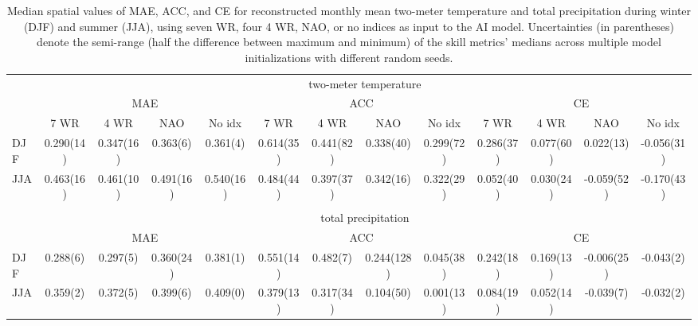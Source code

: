 \begin{table*}
    \centering
    \begin{tabular}{lcccccccccccc}
    \toprule
    &\multicolumn{12}{c}{two-meter temperature}\\
    &\multicolumn{4}{c}{MAE}    &\multicolumn{4}{c}{ACC}    &\multicolumn{4}{c}{CE}\\
    \cmidrule(lr){2-5} \cmidrule(lr){6-9} \cmidrule(lr){10-13}
              &7 WR  &4 WR  &NAO  &No idx  &7 WR  &4 WR  &NAO  &No idx  &7 WR  &4 WR  &NAO  &No idx\\
    DJF    &0.290(14)  &0.347(16)  &0.363(6)  &0.361(4)  &0.614(35)  &0.441(82)  &0.338(40)  &0.299(72)  &0.286(37)  &0.077(60)  &0.022(13)  &-0.056(31) \\
    JJA    &0.463(16)  &0.461(10)  &0.491(16)  &0.540(16)  &0.484(44)  &0.397(37)  &0.342(16)  &0.322(29)  &0.052(40)  &0.030(24)  &-0.059(52)  &-0.170(43) \\
    \cmidrule(lr){2-13} \\
    &\multicolumn{12}{c}{total precipitation}\\
    &\multicolumn{4}{c}{MAE}    &\multicolumn{4}{c}{ACC}    &\multicolumn{4}{c}{CE}\\
    \cmidrule(lr){2-5} \cmidrule(lr){6-9} \cmidrule(lr){10-13}
    DJF    &0.288(6)  &0.297(5)  &0.360(24)  &0.381(1)  &0.551(14)  &0.482(7)  &0.244(128)  &0.045(38)  &0.242(18)  &0.169(13)  &-0.006(25)  &-0.043(2) \\
    JJA    &0.359(2)  &0.372(5)  &0.399(6)  &0.409(0)  &0.379(13)  &0.317(34)  &0.104(50)  &0.001(13)  &0.084(19)  &0.052(14)  &-0.039(7)  &-0.032(2) \\
    \bottomrule
    \end{tabular}
    \caption{Median spatial values of MAE, ACC, and CE for reconstructed monthly mean two-meter temperature and total precipitation during winter (DJF) and summer (JJA), using seven \ac{WR}, four 4 \ac{WR}, NAO, or no indices as input to the AI model. Uncertainties (in parentheses) denote the semi-range (half the difference between maximum and minimum) of the skill metrics’ medians across multiple model initializations with different random seeds.}
    \label{tab:numWR}
\end{table*}